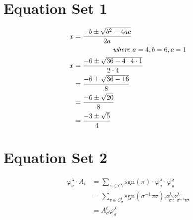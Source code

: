 \documentclass[a4paper]{article}
\begin{document}
    \section*{Equation Set 1}
    \begin{align*}
        x &= \frac{-b \pm \sqrt{b^2 - 4ac}}{2a} \\
        &\hspace{20mm} \textit{where } a = 4, b = 6, c = 1 \\
        x &= \frac{-6 \pm \sqrt{36 - 4 \cdot 4 \cdot 1}}{2 \cdot 4} \\
        &= \frac{-6 \pm \sqrt{36 - 16}}{8} \\
        &= \frac{-6 \pm \sqrt{20}}{8} \\
        &= \frac{-3 \pm \sqrt{5}}{4}
    \end{align*}

    \section*{Equation Set 2}
    \begin{align*}
        \varphi_{\sigma}^{\lambda} \cdot A_{t} &= \sum_{\pi \in C_{t}} \text{sgn}(\pi) \cdot \varphi_{\sigma}^{\lambda} \cdot \varphi_{\pi}^{\lambda} \\
        &= \sum_{\tau \in C_{\sigma}^{t}} \text{sgn}(\sigma^{-1} \tau \sigma) \varphi_{\sigma}^{\lambda} \varphi_{\sigma^{-1} \tau \sigma}^{\lambda} \\
        &= A_{\sigma}^{t} \varphi_{\sigma}^{\lambda}
    \end{align*}
\end{document}
